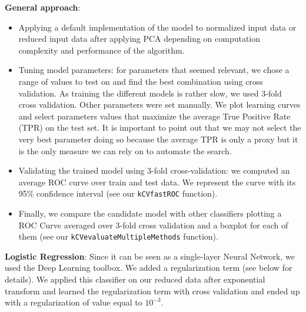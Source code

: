 \documentclass[10pt,a4paper]{article}
\begin{document}
  \textbf{General approach}:
   	\begin{itemize}
	   	\item Applying a default implementation of the model to normalized input data or reduced input data after applying PCA depending on computation complexity and performance of the algorithm.
    		\item Tuning model parameters: for parameters that seemed relevant, we chose a range of values to test on and find the best combination using cross validation. As training the different models is rather slow, we used 3-fold cross validation. Other parameters were set manually. We plot learning curves and select parameters values that maximize the average True Positive Rate (TPR) on the test set. It is important to point out that we may not select the very best parameter doing so because the average TPR is only a proxy but it is the only measure we can rely on to automate the search.
		  \item Validating the trained model using 3-fold cross-validation: we computed an average ROC curve over train and test data. We represent the curve with its 95\% confidence interval (see our \texttt{kCVfastROC} function).
  		\item Finally, we compare the candidate model with other classifiers plotting a ROC Curve averaged over 3-fold cross validation and a boxplot for each of them (see our \texttt{kCVevaluateMultipleMethods} function).\\
	\end{itemize}

  \textbf{Logistic Regression}: Since it can be seen as a single-layer Neural Network, we used the Deep Learning toolbox. We added a regularization term (see below for details). We applied this classifier on our reduced data after exponential transform and learned the regularization term with cross validation and ended up with a regularization of value equal to $10^{-3}$.\\
\end{document}
